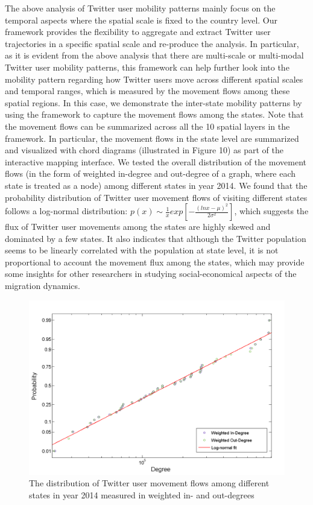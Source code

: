 \documentclass[a4paper, 11pt]{article}
\begin{document}
The above analysis of Twitter user mobility patterns mainly focus on the temporal aspects where the spatial scale is fixed to the country level.
Our framework provides the flexibility to aggregate and extract Twitter user trajectories in a specific spatial scale and re-produce the analysis. 
In particular, as it is evident from the above analysis that there are multi-scale or multi-modal Twitter user mobility patterns, this framework can help further look into the mobility pattern regarding how Twitter users move across different spatial scales and temporal ranges, which is measured by the movement flows among these spatial regions.  In this case, we demonstrate the inter-state mobility patterns by using the framework to capture the movement flows among the states. Note that the movement flows can be summarized across all the 10 spatial layers in the framework. 
In particular, the movement flows in the state level are summarized and visualized with chord diagrams (illustrated in Figure 10) as part of the interactive mapping interface.
We tested the overall distribution of the movement flows (in the form of weighted in-degree and out-degree of a graph, where each state is treated as a node) among different states in year 2014.  
We found that the probability distribution of Twitter user movement flows of visiting different states follows a log-normal distribution: $p(x)\sim \frac{1}{x}exp[-\frac{(lnx - \mu)^{2}}{2\sigma^{2}}]$, which suggests the flux of Twitter user movements among the states are highly skewed and dominated by a few states. It also indicates that although the Twitter population seems to be linearly correlated with the population at state level, it is not proportional to account the movement flux among the states, which may provide some insights for other researchers in studying social-economical aspects of the migration dynamics.

\begin{figure}[h]
\centering
\includegraphics[width=0.8\linewidth]{./figures/degree}
\caption{The distribution of Twitter user movement flows among different states in year 2014 measured in weighted in- and out-degrees}
\label{fig:Arch}
\end{figure}
\FloatBarrier
\end{document}
